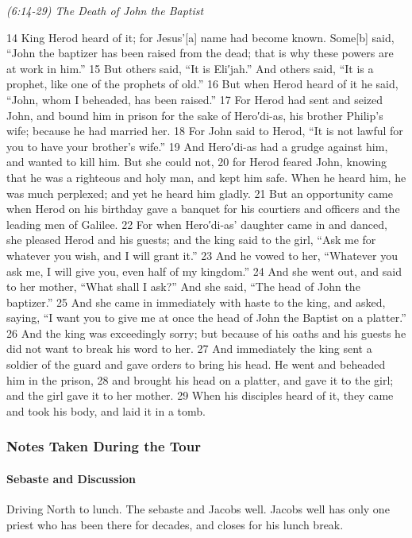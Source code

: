\documentclass[letterpaper]{report}
\begin{document}
{\centering
	\emph{(6:14-29) The Death of John the Baptist}\\
}
\begin{multicols}{2}
14 King Herod heard of it; for Jesus’[a] name had become known. Some[b] said, “John the baptizer has been raised from the dead; that is why these powers are at work in him.” 15 But others said, “It is Eli′jah.” And others said, “It is a prophet, like one of the prophets of old.” 16 But when Herod heard of it he said, “John, whom I beheaded, has been raised.” 17 For Herod had sent and seized John, and bound him in prison for the sake of Hero′di-as, his brother Philip’s wife; because he had married her. 18 For John said to Herod, “It is not lawful for you to have your brother’s wife.” 19 And Hero′di-as had a grudge against him, and wanted to kill him. But she could not, 20 for Herod feared John, knowing that he was a righteous and holy man, and kept him safe. When he heard him, he was much perplexed; and yet he heard him gladly. 21 But an opportunity came when Herod on his birthday gave a banquet for his courtiers and officers and the leading men of Galilee. 22 For when Hero′di-as’ daughter came in and danced, she pleased Herod and his guests; and the king said to the girl, “Ask me for whatever you wish, and I will grant it.” 23 And he vowed to her, “Whatever you ask me, I will give you, even half of my kingdom.” 24 And she went out, and said to her mother, “What shall I ask?” And she said, “The head of John the baptizer.” 25 And she came in immediately with haste to the king, and asked, saying, “I want you to give me at once the head of John the Baptist on a platter.” 26 And the king was exceedingly sorry; but because of his oaths and his guests he did not want to break his word to her. 27 And immediately the king sent a soldier of the guard and gave orders to bring his head. He went and beheaded him in the prison, 28 and brought his head on a platter, and gave it to the girl; and the girl gave it to her mother. 29 When his disciples heard of it, they came and took his body, and laid it in a tomb.
\end{multicols}

\subsubsection{Notes Taken During the Tour}
\paragraph{Sebaste and Discussion}
Driving North to lunch.
The sebaste and Jacobs well. Jacobs well has only one priest who has been there for decades, and closes for his lunch break.
\end{document}
